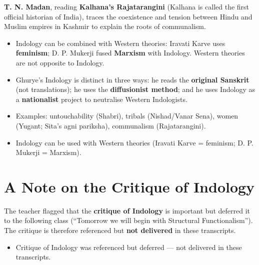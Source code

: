 \begin{ExampleBox}
\textbf{T. N. Madan}, reading \textbf{Kalhana's Rajatarangini} (Kalhana is called the first official historian of India), traces the coexistence and tension between Hindu and Muslim empires in Kashmir to explain the roots of communalism.
\end{ExampleBox}

\begin{CriticalPoint}
\begin{itemize}
\item Indology can be combined with Western theories: Iravati Karve uses \textbf{feminism}; D. P. Mukerji fused \textbf{Marxism} with Indology. Western theories are not opposite to Indology.
\item Ghurye's Indology is distinct in three ways: he reads the \textbf{original Sanskrit} (not translations); he uses the \textbf{diffusionist method}; and he uses Indology as a \textbf{nationalist} project to neutralise Western Indologists.
\end{itemize}
\end{CriticalPoint}

\begin{QuickRevision}
\begin{itemize}
\item Examples: untouchability (Shabri), tribals (Nishad/Vanar Sena), women (Yugant; Sita's agni pariksha), communalism (Rajatarangini).
\item Indology can be used with Western theories (Iravati Karve = feminism; D. P. Mukerji = Marxism).
\end{itemize}
\end{QuickRevision}

\section{A Note on the Critique of Indology}

The teacher flagged that the \textbf{critique of Indology} is important but deferred it to the following class (``Tomorrow we will begin with Structural Functionalism''). The critique is therefore referenced but \textbf{not delivered} in these transcripts.

\begin{QuickRevision}
\begin{itemize}
\item Critique of Indology was referenced but deferred --- not delivered in these transcripts.
\end{itemize}
\end{QuickRevision}
